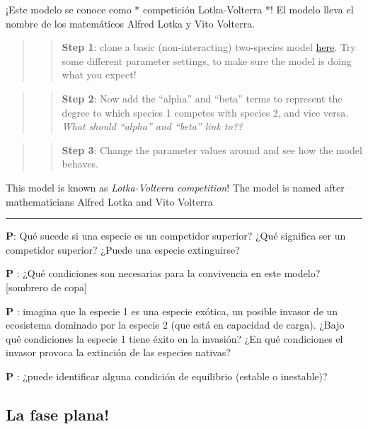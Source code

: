 \documentclass[
]{article}
\begin{document}
¡Este modelo se conoce como * competición Lotka-Volterra *! El modelo
lleva el nombre de los matemáticos Alfred Lotka y Vito Volterra.

\begin{quote}
\begin{quote}
\textbf{Step 1}: clone a basic (non-interacting) two-species model
\href{https://insightmaker.com/insight/77729/Base-2-species-model}{here}.
Try some different parameter settings, to make sure the model is doing
what you expect!
\end{quote}
\end{quote}

\begin{quote}
\begin{quote}
\textbf{Step 2}: Now add the ``alpha'' and ``beta'' terms to represent
the degree to which species 1 competes with species 2, and vice versa.
\emph{What should ``alpha'' and ``beta'' link to??}
\end{quote}
\end{quote}

\begin{quote}
\begin{quote}
\textbf{Step 3}: Change the parameter values around and see how the
model behaves.
\end{quote}
\end{quote}

This model is known as \emph{Lotka-Volterra competition}! The model is
named after mathematicians Alfred Lotka and Vito Volterra

\begin{center}\rule{0.5\linewidth}{0.5pt}\end{center}

\textbf{P}: Qué sucede si una especie es un competidor superior? ¿Qué
significa ser un competidor superior? ¿Puede una especie extinguirse?

\textbf{P }: ¿Qué condiciones son necesarias para la convivencia en este
modelo? {[}sombrero de copa{]}

\textbf{P }: imagina que la especie 1 es una especie exótica, un posible
invasor de un ecosistema dominado por la especie 2 (que está en
capacidad de carga). ¿Bajo qué condiciones la especie 1 tiene éxito en
la invasión? ¿En qué condiciones el invasor provoca la extinción de las
especies nativas?

\textbf{P }: ¿puede identificar alguna condición de equilibrio (estable
o inestable)?

\hypertarget{la-fase-plana}{%
\subsection{La fase plana!}\label{la-fase-plana}}
\end{document}
